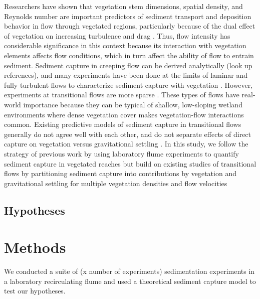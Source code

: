\documentclass{scrreprt}
\begin{document}
Researchers have shown that vegetation stem dimensions, spatial density, and Reynolds number are important predictors of sediment transport and deposition behavior in flow through vegetated regions, particularly because of the dual effect of vegetation on increasing turbulence and drag \citep{Fauria_2015, nepf_drag_1999, Palmer_2004}. Thus, flow intensity has considerable significance in this context because its interaction with vegetation elements affects flow conditions, which in turn affect the ability of flow to entrain sediment. Sediment capture in creeping flow can be derived analytically (look up references), and many experiments have been done at the limits of laminar and fully turbulent flows to characterize sediment capture with vegetation \citep{Shan_turbulence_2020, Wu_2011, Yang_2016}. However, experiments at transitional flows are more sparse \citep{Fauria_2015, Palmer_2004, Purich_2007}. These types of flows have real-world importance because they can be typical of shallow, low-sloping wetland environments where dense vegetation cover makes vegetation-flow interactions common. Existing predictive models of sediment capture in transitional flows generally do not agree well with each other, and do not separate effects of direct capture on vegetation versus gravitational settling \citep{Fauria_2015, Palmer_2004}. In this study, we follow the strategy of previous work by using laboratory flume experiments to quantify sediment capture in vegetated reaches but build on existing studies of transitional flows by partitioning sediment capture into contributions by vegetation and gravitational settling for multiple vegetation densities and flow velocities 

\section{Hypotheses}


\chapter{Methods}


We conducted a suite of (x number of experiments) sedimentation experiments in a laboratory recirculating flume and used a theoretical sediment capture model to test our hypotheses. 
\end{document}
